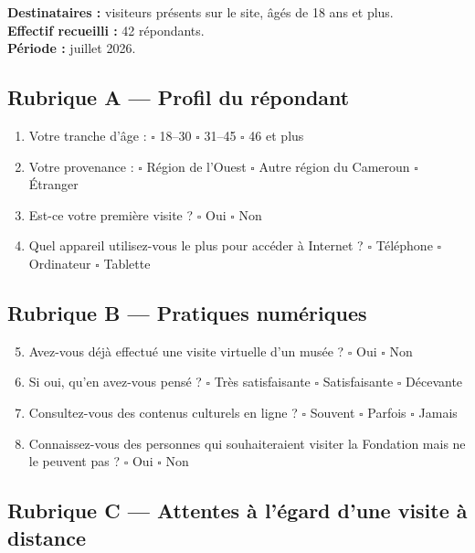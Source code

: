 \textbf{Destinataires :} visiteurs présents sur le site, âgés de 18 ans et
plus.\\
\textbf{Effectif recueilli :} 42 répondants.\\
\textbf{Période :} juillet 2026.

\subsection*{Rubrique A — Profil du répondant}

\begin{enumerate}
  \item Votre tranche d'âge : \quad $\square$ 18--30 \quad $\square$ 31--45 \quad
        $\square$ 46 et plus
  \item Votre provenance : \quad $\square$ Région de l'Ouest \quad
        $\square$ Autre région du Cameroun \quad $\square$ Étranger
  \item Est-ce votre première visite ? \quad $\square$ Oui \quad $\square$ Non
  \item Quel appareil utilisez-vous le plus pour accéder à Internet ? \quad
        $\square$ Téléphone \quad $\square$ Ordinateur \quad $\square$ Tablette
\end{enumerate}

\subsection*{Rubrique B — Pratiques numériques}

\begin{enumerate}\setcounter{enumi}{4}
  \item Avez-vous déjà effectué une visite virtuelle d'un musée ? \quad
        $\square$ Oui \quad $\square$ Non
  \item Si oui, qu'en avez-vous pensé ? \quad $\square$ Très satisfaisante \quad
        $\square$ Satisfaisante \quad $\square$ Décevante
  \item Consultez-vous des contenus culturels en ligne ? \quad
        $\square$ Souvent \quad $\square$ Parfois \quad $\square$ Jamais
  \item Connaissez-vous des personnes qui souhaiteraient visiter la Fondation
        mais ne le peuvent pas ? \quad $\square$ Oui \quad $\square$ Non
\end{enumerate}

\subsection*{Rubrique C — Attentes à l'égard d'une visite à distance}

